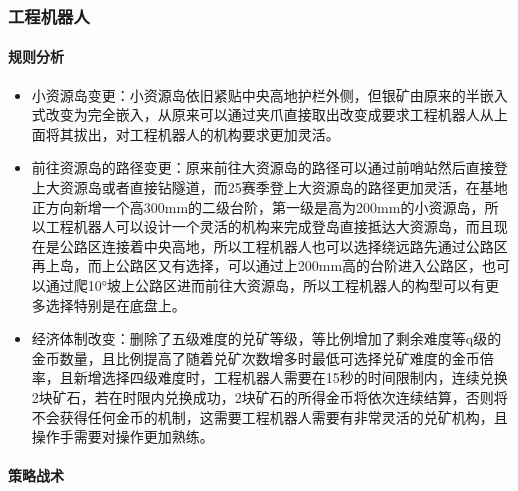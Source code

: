 \subsubsection{工程机器人}

    \paragraph{规则分析}


        \begin{itemize}
            \item 小资源岛变更：小资源岛依旧紧贴中央高地护栏外侧，但银矿由原来的半嵌入式改变为完全嵌入，从原来可以通过夹爪直接取出改变成要求工程机器人从上面将其拔出，对工程机器人的机构要求更加灵活。
            \item 前往资源岛的路径变更：原来前往大资源岛的路径可以通过前哨站然后直接登上大资源岛或者直接钻隧道，而25赛季登上大资源岛的路径更加灵活，在基地正方向新增一个高300mm的二级台阶，第一级是高为200mm的小资源岛，所以工程机器人可以设计一个灵活的机构来完成登岛直接抵达大资源岛，而且现在是公路区连接着中央高地，所以工程机器人也可以选择绕远路先通过公路区再上岛，而上公路区又有选择，可以通过上200mm高的台阶进入公路区，也可以通过爬10°坡上公路区进而前往大资源岛，所以工程机器人的构型可以有更多选择特别是在底盘上。
            \item 经济体制改变：删除了五级难度的兑矿等级，等比例增加了剩余难度等q级的金币数量，且比例提高了随着兑矿次数增多时最低可选择兑矿难度的金币倍率，且新增选择四级难度时，工程机器人需要在15秒的时间限制内，连续兑换2块矿石，若在时限内兑换成功，2块矿石的所得金币将依次连续结算，否则将不会获得任何金币的机制，这需要工程机器人需要有非常灵活的兑矿机构，且操作手需要对操作更加熟练。 
        \end{itemize}
    
    \paragraph{策略战术}


